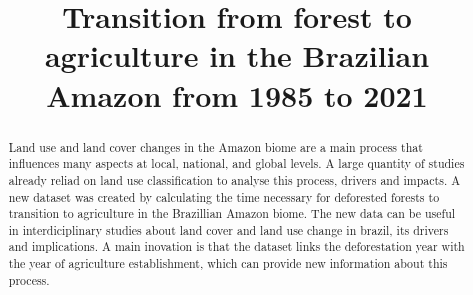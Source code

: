 \documentclass[essd, manuscript]{copernicus}
\begin{document}
\title{Transition from forest to agriculture in the Brazilian Amazon from 1985 to 2021}











\received{}
\pubdiscuss{} %
\revised{}
\accepted{}
\published{}




\maketitle


\begin{abstract}
Land use and land cover changes in the Amazon biome are a main process that influences many aspects at local, national, and global levels. A large quantity of studies already reliad on land use classification to analyse this process, drivers and impacts. A new dataset was created by calculating the time necessary for deforested forests to transition to agriculture in the Brazillian Amazon biome. The new data can be useful in interdiciplinary studies about land cover and land use change in brazil, its drivers and implications. A main inovation is that the dataset links the deforestation year with the year of agriculture establishment, which can provide new information about this process.
\end{abstract}




\introduction[Introduction]
\end{document}
